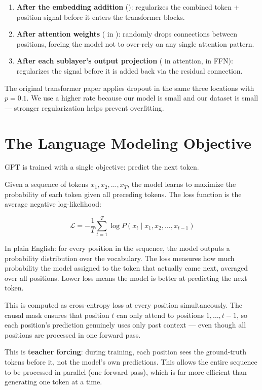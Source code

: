 \begin{enumerate}
  \item \textbf{After the embedding addition} (): regularizes the combined token + position signal before it enters the transformer blocks.
  \item \textbf{After attention weights} ( in ): randomly drops connections between positions, forcing the model not to over-rely on any single attention pattern.
  \item \textbf{After each sublayer's output projection} ( in attention,  in FFN): regularizes the signal before it is added back via the residual connection.
\end{enumerate}

The original transformer paper applies dropout in the same three locations with $p = 0.1$. We use a higher rate because our model is small and our dataset is small --- stronger regularization helps prevent overfitting.

\section{The Language Modeling Objective}

GPT is trained with a single objective: predict the next token.

Given a sequence of tokens $x_1, x_2, \ldots, x_T$, the model learns to maximize the probability of each token given all preceding tokens. The loss function is the average negative log-likelihood:

\[\mathcal{L} = -\frac{1}{T} \sum_{t=1}^{T} \log P(x_t \mid x_1, x_2, \ldots, x_{t-1})\]

In plain English: for every position in the sequence, the model outputs a probability distribution over the vocabulary. The loss measures how much probability the model assigned to the token that actually came next, averaged over all positions. Lower loss means the model is better at predicting the next token.

This is computed as cross-entropy loss at every position simultaneously. The causal mask ensures that position $t$ can only attend to positions $1, \ldots, t-1$, so each position's prediction genuinely uses only past context --- even though all positions are processed in one forward pass.

This is \textbf{teacher forcing}: during training, each position sees the ground-truth tokens before it, not the model's own predictions. This allows the entire sequence to be processed in parallel (one forward pass), which is far more efficient than generating one token at a time.


